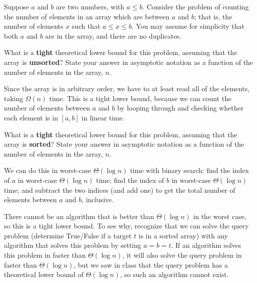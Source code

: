 \begin{prob}[(2 points)]
    Suppose $a$ and $b$ are two numbers, with $a \leq b$.
    Consider the problem of counting the number of elements in an array which
    are between $a$ and $b$; that is, the number of elements $x$ such that $a
    \leq x \leq b$. You may assume for simplicity that both $a$ and $b$ are in the array,
    and there are no duplicates.

    \begin{subprobset}
        \begin{subprob}
            What is a \textbf{tight} theoretical lower bound for this problem, assuming that
            the array is \textbf{unsorted}? State your answer in asymptotic notation as a function
            of the number of elements in the array, $n$.


            \begin{soln}
                Since the array is in arbitrary order, we have to at least read all
                of the elements, taking $\Omega(n)$ time. This is a tight lower bound,
                because we can count the number of elements between $a$ and $b$ by
                looping through and checking whether each element is in $[a, b]$
                in linear time.
            \end{soln}
        \end{subprob}

        \begin{subprob}
            What is a \textbf{tight} theoretical lower bound for this problem, assuming that
            the array is \textbf{sorted}? State your answer in asymptotic notation as a function
            of the number of elements in the array, $n$.


            \begin{soln}
                We can do this in worst-case $\Theta(\log n)$ time with binary search:
                find the index of $a$ in worst-case $\Theta(\log n)$ time;
                find the index of $b$ in worst-case $\Theta(\log n)$ time;
                and subtract the two indices (and add one) to get the total number
                of elements between $a$ and $b$, inclusive.

                There cannot be an algorithm that is better than $\Theta(\log n)$
                in the worst case, so this is a tight lower bound. To see why, recognize
                that we can solve the query problem (determine True/False if a target $t$
                is in a sorted array) with any algorithm that solves this problem by
                setting $a = b = t$. If an algorithm solves this problem in faster than
                $\Theta(\log n)$, it will also solve the query problem in faster than
                $\Theta(\log n)$, but we saw in class that the query problem has a theoretical
                lower bound of $\Theta(\log n)$, so such an algorithm cannot exist.
            \end{soln}


\end{subprob}
\end{subprobset}
\end{prob}
